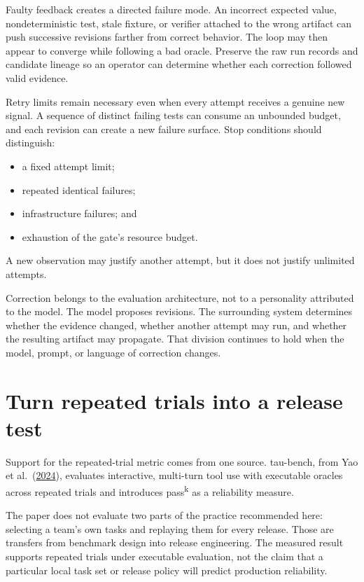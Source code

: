 Faulty feedback creates a directed failure mode. An incorrect expected value, nondeterministic test, stale fixture, or verifier attached to the wrong artifact can push successive revisions farther from correct behavior. The loop may then appear to converge while following a bad oracle. Preserve the raw run records and candidate lineage so an operator can determine whether each correction followed valid evidence.

Retry limits remain necessary even when every attempt receives a genuine new signal. A sequence of distinct failing tests can consume an unbounded budget, and each revision can create a new failure surface. Stop conditions should distinguish:

\begin{itemize}
\tightlist
\item
  a fixed attempt limit;
\item
  repeated identical failures;
\item
  infrastructure failures; and
\item
  exhaustion of the gate's resource budget.
\end{itemize}

A new observation may justify another attempt, but it does not justify unlimited attempts.

Correction belongs to the evaluation architecture, not to a personality attributed to the model. The model proposes revisions. The surrounding system determines whether the evidence changed, whether another attempt may run, and whether the resulting artifact may propagate. That division continues to hold when the model, prompt, or language of correction changes.

\section{Turn repeated trials into a release test}\label{turn-repeated-trials-into-a-release-test}

Support for the repeated-trial metric comes from one source. tau-bench, from Yao et al.~(\href{https://arxiv.org/abs/2406.12045}{2024}), evaluates interactive, multi-turn tool use with executable oracles across repeated trials and introduces pass\textsuperscript{k} as a reliability measure.

The paper does not evaluate two parts of the practice recommended here: selecting a team's own tasks and replaying them for every release. Those are transfers from benchmark design into release engineering. The measured result supports repeated trials under executable evaluation, not the claim that a particular local task set or release policy will predict production reliability.

